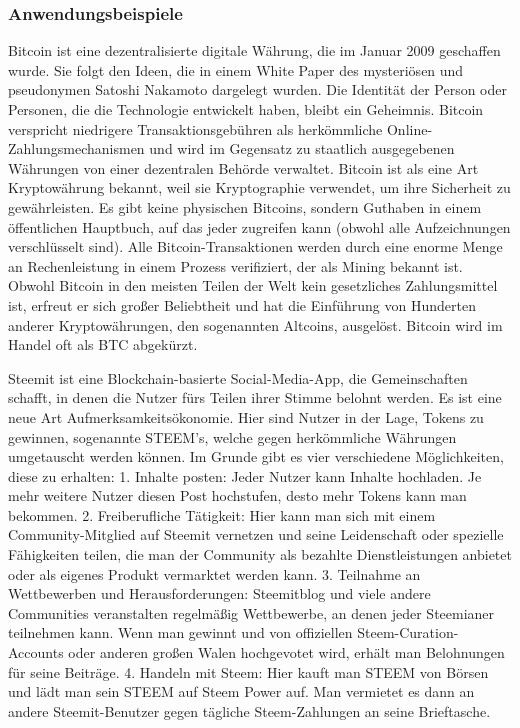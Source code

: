 \subsubsection{Anwendungsbeispiele}

Bitcoin ist eine dezentralisierte digitale Währung, die im Januar 2009 geschaffen wurde. 
Sie folgt den Ideen, die in einem White Paper des mysteriösen und pseudonymen Satoshi Nakamoto dargelegt wurden. 
Die Identität der Person oder Personen, die die Technologie entwickelt haben, bleibt ein Geheimnis. 
Bitcoin verspricht niedrigere Transaktionsgebühren als herkömmliche Online-Zahlungsmechanismen und wird im Gegensatz zu staatlich ausgegebenen Währungen von einer dezentralen Behörde verwaltet.
Bitcoin ist als eine Art Kryptowährung bekannt, weil sie Kryptographie verwendet, um ihre Sicherheit zu gewährleisten. 
Es gibt keine physischen Bitcoins, sondern Guthaben in einem öffentlichen Hauptbuch, auf das jeder zugreifen kann (obwohl alle Aufzeichnungen verschlüsselt sind). 
Alle Bitcoin-Transaktionen werden durch eine enorme Menge an Rechenleistung in einem Prozess verifiziert, der als Mining bekannt ist. 
Obwohl Bitcoin in den meisten Teilen der Welt kein gesetzliches Zahlungsmittel ist, erfreut er sich großer Beliebtheit und hat die Einführung von Hunderten anderer Kryptowährungen, den sogenannten Altcoins, ausgelöst. 
Bitcoin wird im Handel oft als BTC abgekürzt.

Steemit ist eine Blockchain-basierte Social-Media-App, die Gemeinschaften schafft, in denen die Nutzer fürs Teilen ihrer Stimme belohnt werden. 
Es ist eine neue Art Aufmerksamkeitsökonomie. 
Hier sind Nutzer in der Lage, Tokens zu gewinnen, sogenannte STEEM’s, welche gegen herkömmliche Währungen umgetauscht werden können. 
Im Grunde gibt es vier verschiedene Möglichkeiten, diese zu erhalten: 
1. Inhalte posten: Jeder Nutzer kann Inhalte hochladen. Je mehr weitere Nutzer diesen Post hochstufen, desto mehr Tokens kann man bekommen. 
2. Freiberufliche Tätigkeit: Hier kann man sich mit einem Community-Mitglied auf Steemit vernetzen und seine Leidenschaft oder spezielle Fähigkeiten teilen, die man der Community als bezahlte Dienstleistungen anbietet oder als eigenes Produkt vermarktet werden kann. 
3. Teilnahme an Wettbewerben und Herausforderungen: Steemitblog und viele andere Communities veranstalten regelmäßig Wettbewerbe, an denen jeder Steemianer teilnehmen kann. Wenn man gewinnt und von offiziellen Steem-Curation-Accounts oder anderen großen Walen hochgevotet wird, erhält man Belohnungen für seine Beiträge.
4. Handeln mit Steem: Hier kauft man STEEM von Börsen und lädt man sein STEEM auf Steem Power auf. Man vermietet es dann an andere Steemit-Benutzer gegen tägliche Steem-Zahlungen an seine Brieftasche.

